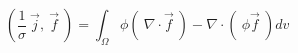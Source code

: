 \begin{equation}
\left( \frac{1}{\sigma}~\vec{j}, ~\vec{f}~ \right) =
\int_\Omega \phi \left(~\nabla \cdot \vec{f} ~ \right) - \nabla \cdot \left(  ~\phi\vec{f} ~ \right) dv
\end{equation}
